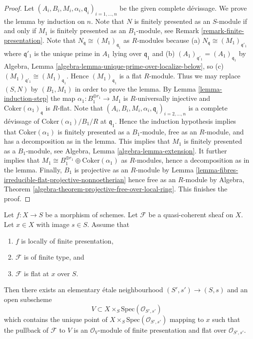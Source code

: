 \begin{proof}
Let $(A_i, B_i, M_i, \alpha_i, \mathfrak q_i)_{i = 1, \ldots, n}$
be the given complete d\'evissage. We prove the lemma by induction on $n$.
Note that $N$ is finitely presented as an $S$-module if and only if
$M_1$ is finitely presented as an $B_1$-module, see
Remark \ref{remark-finite-presentation}.
Note that $N_{\mathfrak q} \cong (M_1)_{\mathfrak q_1}$ as $R$-modules
because (a) $N_{\mathfrak q} \cong (M_1)_{\mathfrak q'_1}$ where
$\mathfrak q'_1$ is the unique prime in $A_1$ lying over $\mathfrak q_1$
and (b) $(A_1)_{\mathfrak q'_1} = (A_1)_{\mathfrak q_1}$ by
Algebra, Lemma \ref{algebra-lemma-unique-prime-over-localize-below},
so (c) $(M_1)_{\mathfrak q'_1} \cong (M_1)_{\mathfrak q_1}$.
Hence $(M_1)_{\mathfrak q_1}$ is a flat $R$-module. Thus we may replace
$(S, N)$ by $(B_1, M_1)$ in order to prove the lemma. By
Lemma \ref{lemma-induction-step}
the map $\alpha_1 : B_1^{\oplus r_1} \to M_1$ is $R$-universally injective
and $\text{Coker}(\alpha_1)_{\mathfrak q}$ is $R$-flat.
Note that $(A_i, B_i, M_i, \alpha_i, \mathfrak q_i)_{i = 2, \ldots, n}$
is a complete d\'evissage of $\text{Coker}(\alpha_1)/B_1/R$ at
$\mathfrak q_1$. Hence the induction hypothesis
implies that $\text{Coker}(\alpha_1)$ is finitely presented as a
$B_1$-module, free as an $R$-module, and has a decomposition as in the lemma.
This implies that $M_1$ is finitely presented as a $B_1$-module, see
Algebra, Lemma \ref{algebra-lemma-extension}.
It further implies that
$M_1 \cong B_1^{\oplus r_1} \oplus \text{Coker}(\alpha_1)$
as $R$-modules, hence a decomposition as in the lemma.
Finally, $B_1$ is projective as an $R$-module by
Lemma \ref{lemma-fibres-irreducible-flat-projective-nonnoetherian}
hence free as an $R$-module by
Algebra, Theorem \ref{algebra-theorem-projective-free-over-local-ring}.
This finishes the proof.
\end{proof}

\begin{proposition}
\label{proposition-finite-type-flat-at-point}
Let $f : X \to S$ be a morphism of schemes.
Let $\mathcal{F}$ be a quasi-coherent sheaf on $X$.
Let $x \in X$ with image $s \in S$.
Assume that
\begin{enumerate}
\item $f$ is locally of finite presentation,
\item $\mathcal{F}$ is of finite type, and
\item $\mathcal{F}$ is flat at $x$ over $S$.
\end{enumerate}
Then there exists an elementary \'etale neighbourhood $(S', s') \to (S, s)$
and an open subscheme
$$
V \subset X \times_S \text{Spec}(\mathcal{O}_{S', s'})
$$
which contains the unique point of
$X \times_S \text{Spec}(\mathcal{O}_{S', s'})$ mapping to $x$
such that the pullback of $\mathcal{F}$ to $V$ is an $\mathcal{O}_V$-module
of finite presentation and flat over $\mathcal{O}_{S', s'}$.
\end{proposition}

